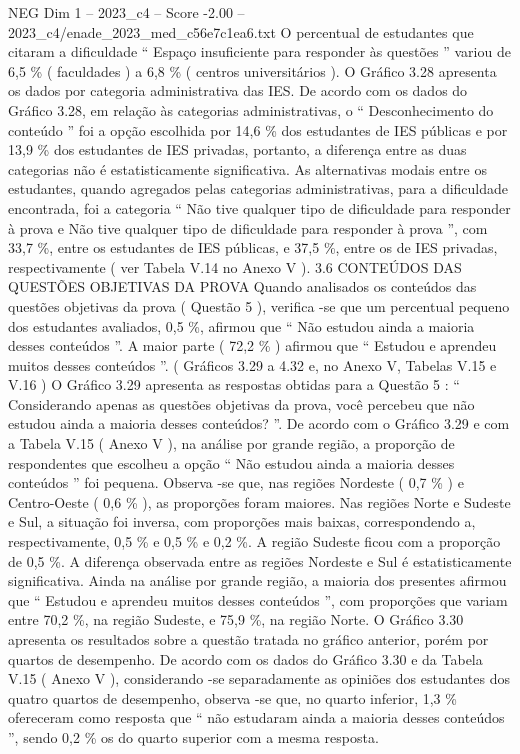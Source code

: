 \begin{textsample}{NEG Dim 1 – 2023\_c4 – Score -2.00 – 2023\_c4/enade\_2023\_med\_c56e7c1ea6.txt}
O percentual de estudantes que citaram a dificuldade “ Espaço insuficiente para responder às questões ” variou de 6,5 \% ( faculdades ) a 6,8 \% ( centros universitários ).
O Gráfico 3.28 apresenta os dados por categoria administrativa das IES.
De acordo com os dados do Gráfico 3.28, em relação às categorias administrativas, o “ Desconhecimento do conteúdo ” foi a opção escolhida por 14,6 \% dos estudantes de IES públicas e por 13,9 \% dos estudantes de IES privadas, portanto, a diferença entre as duas categorias não é estatisticamente significativa.
As alternativas modais entre os estudantes, quando agregados pelas categorias administrativas, para a dificuldade encontrada, foi a categoria “ Não tive qualquer tipo de dificuldade para responder à prova e Não tive qualquer tipo de dificuldade para responder à prova ”, com 33,7 \%, entre os estudantes de IES públicas, e 37,5 \%, entre os de IES privadas, respectivamente ( ver Tabela V.14 no Anexo V ). 3.6 CONTEÚDOS DAS QUESTÕES OBJETIVAS DA PROVA Quando analisados os conteúdos das questões objetivas da prova ( Questão 5 ), verifica -se que um percentual pequeno dos estudantes avaliados, 0,5 \%, afirmou que “ Não estudou ainda a maioria desses conteúdos ”.
A maior parte ( 72,2 \% ) afirmou que “ Estudou e aprendeu muitos desses conteúdos ”. ( Gráficos 3.29 a 4.32 e, no Anexo V, Tabelas V.15 e V.16 ) O Gráfico 3.29 apresenta as respostas obtidas para a Questão 5 : “ Considerando apenas as questões objetivas da prova, você percebeu que não estudou ainda a maioria desses conteúdos? ”.
De acordo com o Gráfico 3.29 e com a Tabela V.15 ( Anexo V ), na análise por grande região, a proporção de respondentes que escolheu a opção “ Não estudou ainda a maioria desses conteúdos ” foi pequena.
Observa -se que, nas regiões Nordeste ( 0,7 \% ) e Centro-Oeste ( 0,6 \% ), as proporções foram maiores.
Nas regiões Norte e Sudeste e Sul, a situação foi inversa, com proporções mais baixas, correspondendo a, respectivamente, 0,5 \% e 0,5 \% e 0,2 \%.
A região Sudeste ficou com a proporção de 0,5 \%.
A diferença observada entre as regiões Nordeste e Sul é estatisticamente significativa.
Ainda na análise por grande região, a maioria dos presentes afirmou que “ Estudou e aprendeu muitos desses conteúdos ”, com proporções que variam entre 70,2 \%, na região Sudeste, e 75,9 \%, na região Norte.
O Gráfico 3.30 apresenta os resultados sobre a questão tratada no gráfico anterior, porém por quartos de desempenho.
De acordo com os dados do Gráfico 3.30 e da Tabela V.15 ( Anexo V ), considerando -se separadamente as opiniões dos estudantes dos quatro quartos de desempenho, observa -se que, no quarto inferior, 1,3 \% ofereceram como resposta que “ não estudaram ainda a maioria desses conteúdos ”, sendo 0,2 \% os do quarto superior com a mesma resposta.

\end{textsample}
